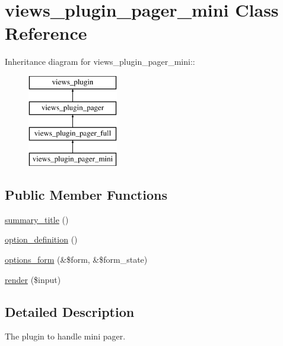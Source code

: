 \hypertarget{classviews__plugin__pager__mini}{
\section{views\_\-plugin\_\-pager\_\-mini Class Reference}
\label{classviews__plugin__pager__mini}
}
Inheritance diagram for views\_\-plugin\_\-pager\_\-mini::\begin{figure}[H]
\begin{center}
\leavevmode
\includegraphics[height=4cm]{classviews__plugin__pager__mini}
\end{center}
\end{figure}
\subsection*{Public Member Functions}
\begin{DoxyCompactItemize}
\item 
\hyperlink{classviews__plugin__pager__mini_af95c2913ea9b9db423fb0761e543ea09}{summary\_\-title} ()
\item 
\hyperlink{classviews__plugin__pager__mini_a35f1785b28b6ddf55a96c8bf0f43a4ad}{option\_\-definition} ()
\item 
\hyperlink{classviews__plugin__pager__mini_adfab7244c29b6398132916429741bc1f}{options\_\-form} (\&\$form, \&\$form\_\-state)
\item 
\hyperlink{classviews__plugin__pager__mini_a71a931670147e0b4356b3a0133104933}{render} (\$input)
\end{DoxyCompactItemize}


\subsection{Detailed Description}
The plugin to handle mini pager. 


